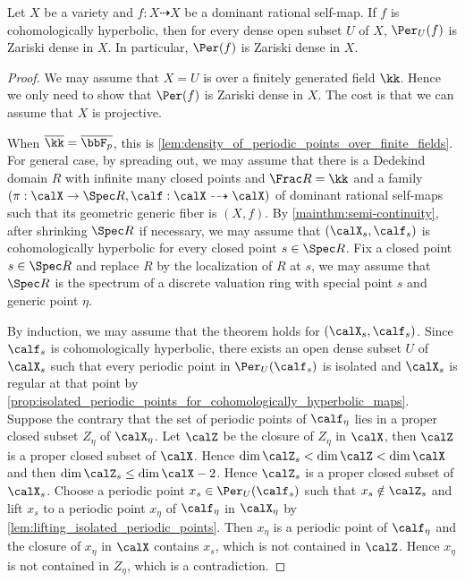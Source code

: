   \begin{theorem}\label{thm:density_of_periodic_points_for_cohomologically_hyperbolic_maps}
    Let $X$ be a variety and $f: X \dashrightarrow X$ be a dominant rational self-map.
    If $f$ is cohomologically hyperbolic, then for every dense open subset $U$ of $X$, $\Per_U(f)$ is Zariski dense in $X$.
    In particular, $\Per(f)$ is Zariski dense in $X$.
  \end{theorem}
  \begin{proof}
    We may assume that $X = U$ is over a finitely generated field $\kk$.
    Hence we only need to show that $\Per(f)$ is Zariski dense in $X$.
    The cost is that we can assume that $X$ is projective.

    When $\overline{\kk} = \overline{\bbF_p}$, this is \cref{lem:density_of_periodic_points_over_finite_fields}.
    For general case, by spreading out, we may assume that there is a Dedekind domain $R$ with infinite many closed points and $\Frac R = \kk$ and a family $(\pi: \calX \to \Spec R, \calf:\calX \dashrightarrow \calX)$ of dominant rational self-maps such that its geometric generic fiber is $(X,f)$.
    By \cref{mainthm:semi-continuity}, after shrinking $\Spec R$ if necessary, we may assume that $(\calX_s, \calf_s)$ is cohomologically hyperbolic for every closed point $s \in \Spec R$.
    Fix a closed point $s \in \Spec R$ and replace $R$ by the localization of $R$ at $s$, we may assume that $\Spec R$ is the spectrum of a discrete valuation ring with special point $s$ and generic point $\eta$.

    By induction, we may assume that the theorem holds for $(\calX_s, \calf_s)$.
    Since $\calf_s$ is cohomologically hyperbolic, there exists an open dense subset $U$ of $\calX_s$ such that every periodic point in $\Per_U(\calf_s)$ is isolated and $\calX_s$ is regular at that point by \cref{prop:isolated_periodic_points_for_cohomologically_hyperbolic_maps}.
    Suppose the contrary that the set of periodic points of $\calf_\eta$ lies in a proper closed subset $Z_\eta$ of $\calX_\eta$.
    Let $\calZ$ be the closure of $Z_\eta$ in $\calX$, then $\calZ$ is a proper closed subset of $\calX$.
    Hence $\dim \calZ_s < \dim \calZ < \dim \calX$ and then $\dim \calZ_s \leq \dim \calX - 2$.
    Hence $\calZ_s$ is a proper closed subset of $\calX_s$.
    Choose a periodic point $x_s \in \Per_U(\calf_s)$ such that $x_s \notin \calZ_s$ and lift $x_s$ to a periodic point $x_\eta$ of $\calf_\eta$ in $\calX_\eta$ by \cref{lem:lifting_isolated_periodic_points}.
    Then $x_\eta$ is a periodic point of $\calf_\eta$ and the closure of $x_\eta$ in $\calX$ contains $x_s$, which is not contained in $\calZ$.
    Hence $x_\eta$ is not contained in $Z_\eta$, which is a contradiction.
  \end{proof}